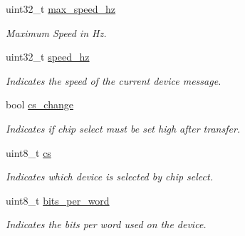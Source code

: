 \begin{DoxyCompactItemize}
\mbox{\label{structspi__bus_ab4b06f1e7a0504f8f1004cb50bc3f158}} 
uint32\+\_\+t \mbox{\hyperlink{structspi__bus_ab4b06f1e7a0504f8f1004cb50bc3f158}{max\+\_\+speed\+\_\+hz}}
\begin{DoxyCompactList}\small\item\em Maximum Speed in Hz. \end{DoxyCompactList}\item 
\mbox{\label{structspi__bus_a7f3068cffeacb95e364c203c56950449}} 
uint32\+\_\+t \mbox{\hyperlink{structspi__bus_a7f3068cffeacb95e364c203c56950449}{speed\+\_\+hz}}
\begin{DoxyCompactList}\small\item\em Indicates the speed of the current device message. \end{DoxyCompactList}\item 
\mbox{\label{structspi__bus_a7d703653ed4aa2504e1a6da3837bed9c}} 
bool \mbox{\hyperlink{structspi__bus_a7d703653ed4aa2504e1a6da3837bed9c}{cs\+\_\+change}}
\begin{DoxyCompactList}\small\item\em Indicates if chip select must be set high after transfer. \end{DoxyCompactList}\item 
\mbox{\label{structspi__bus_a33bca6f6e2309fee3c10a62afa7c4811}} 
uint8\+\_\+t \mbox{\hyperlink{structspi__bus_a33bca6f6e2309fee3c10a62afa7c4811}{cs}}
\begin{DoxyCompactList}\small\item\em Indicates which device is selected by chip select. \end{DoxyCompactList}\item 
\mbox{\label{structspi__bus_ace586315b7db3d9bc321c69081726c62}} 
uint8\+\_\+t \mbox{\hyperlink{structspi__bus_ace586315b7db3d9bc321c69081726c62}{bits\+\_\+per\+\_\+word}}
\begin{DoxyCompactList}\small\item\em Indicates the bits per word used on the device. \end{DoxyCompactList}\item 
\mbox{\label{structspi__bus_a64db0fe4b0d24a648c80c184870903be}} 

\end{DoxyCompactItemize}
